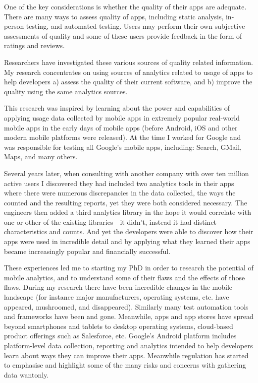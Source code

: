 One of the key considerations is whether the quality of their apps are adequate. There are many ways to assess quality of apps, including static analysis, in-person testing, and automated testing. Users may perform their own subjective assessments of quality and some of these users provide feedback in the form of ratings and reviews. 

Researchers have investigated these various sources of quality related information. My research concentrates on using sources of analytics related to usage of apps to help developers a) assess the quality of their current software, and b) improve the quality using the same analytics sources.

This research was inspired by learning about the power and capabilities of applying usage data collected by mobile apps in extremely popular real-world mobile apps in the early days of mobile apps (before Android, iOS and other modern mobile platforms were released). At the time I worked for Google and was responsible for testing all Google's mobile apps, including: Search, GMail, Maps, and many others.

Several years later, when consulting with another company with over ten million active users I discovered they had included two analytics tools in their apps where there were numerous discrepancies in the data collected, the ways the counted and the resulting reports, yet they were both considered necessary. The engineers then added a third analytics library in the hope it would correlate with one or other of the existing libraries - it didn't, instead it had distinct characteristics and counts. And yet the developers were able to discover how their apps were used in incredible detail and by applying what they learned their apps became increasingly popular and financially successful.

These experiences led me to starting my PhD in order to research the potential of mobile analytics, and to understand some of their flaws and the effects of those flaws. During my research there have been incredible changes in the mobile landscape (for instance major manufacturers, operating systems, etc. have appeared, mushroomed, and disappeared). Similarly many test automation tools and frameworks have been and gone. Meanwhile, apps and app stores have spread beyond smartphones and tablets to desktop operating systems, cloud-based product offerings such as Salesforce, etc. Google's Android platform includes platform-level data collection, reporting and analytics intended to help developers learn about ways they can improve their apps. Meanwhile regulation has started to emphasise and highlight some of the many risks and concerns with gathering data wantonly. 

